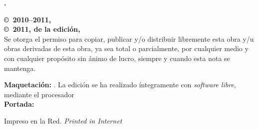 \noindent
\textbf{\titlename. \subtitlename}\\
\authorname

\footnotesize

\bigskip\bigskip\noindent
\textbf{\copyright\ 2010--2011, \authorname}\\
\textbf{\copyright\ 2011, de la edición, \editorname}\\
Se otorga el permiso para copiar, publicar y/o distribuir libremente esta obra y/u obras derivadas de esta obra, ya sea total o parcialmente, por cualquier medio y con cualquier propósito sin ánimo de lucro, siempre y cuando esta nota se mantenga.\\

\bigskip\noindent
\textbf{Maquetación:} \editorname. La edición se ha realizado íntegramente con \emph{software libre}, mediante el procesador \emph{\LaTeXe}\\
\textbf{Portada:} \coverauthorname

\bigskip\noindent
Impreso en la Red. \emph{Printed in Internet}\\

\normalsize

\endinput
